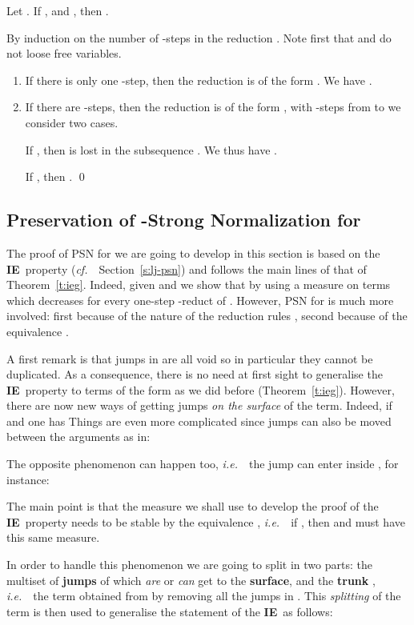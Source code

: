 \documentclass{LMCS}
\newcommand{\ie}{{\it  i.e.}~}
\newcommand{\cf}{{\it  cf.}~}
\renewcommand{\>}{\rightarrow}
\newcommand{\deft}[1]{{\bf #1}}
\newcommand{\iep}{{\bf IE}}
\begin{document}
\begin{cor}
\label{c:stability-substitution}
Let . 
If ,  and ,
then . 
\end{cor}

\proof
By induction on the number of -steps in the reduction 
.
Note first that  and  do not loose free variables.

\begin{enumerate}[] 
\item If there is only one -step, then the reduction is of the form .  We have .
\item If there are  -steps, then the reduction is of the
  form , with  -steps from  to
   we consider two cases. 


If , then  is lost in the subsequence 
. We thus have
.

If , then
.
\qed
\end{enumerate}

\subsection{Preservation of -Strong Normalization for  }
\label{s:iep-for-lauxm}

The proof of PSN for  we are going to develop in this
section is based on the \iep\ property (\cf\ Section~\ref{s:lj-psn}) and follows the main lines of
that of Theorem~\ref{t:ieg}.  
Indeed, given  and
 we show that
 by using a measure on terms
which decreases for every  one-step -reduct of .
However, 
PSN for  is much more involved: first because of the nature of the reduction rules , 
second because of the equivalence . 

A first remark is that jumps
in  are all void  so in particular 
they
cannot be duplicated. As a consequence, 
there is no need at first sight to generalise the \iep\ property to terms of
the form  as we did before 
(Theorem~\ref{t:ieg}). However,
there are now new ways of getting jumps 
\textit{on the surface} of
the term. Indeed, if  and  one 
has 
Things are even more complicated since jumps
can also be moved between the arguments 
as in: 
 
The opposite phenomenon can happen too, \ie\
the jump  can enter inside , for instance:
 
The main point is that the
measure we shall use to develop the proof of the \iep\ property needs to be stable by 
the equivalence , \ie\ 
if , then  and 
must have this same measure. 

In order to handle this phenomenon we are going to split  in two
parts: the multiset  of \deft{jumps} of 
which \textit{are} or \textit{can} get to the \deft{surface}, and the 
\deft{trunk}
, \ie\  the term obtained from  by removing all the jumps in
. This \textit{splitting} of the term is then used to
generalise the statement of the \iep\ as follows:
\end{document}
